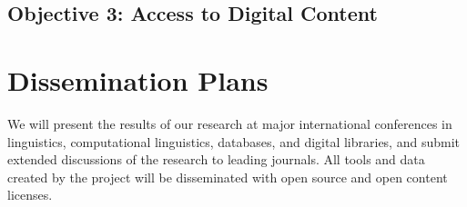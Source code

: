 \vspace{1in}

\subsection*{Objective 3: Access to Digital Content}

\vspace{1in}

\section{Dissemination Plans}
\label{sec:dissemination}

We will present the results of our research at major international
conferences in linguistics, computational linguistics, databases, and
digital libraries, and submit extended discussions of the research to
leading journals.  All tools and data created by the project will be
disseminated with open source and open content licenses.

